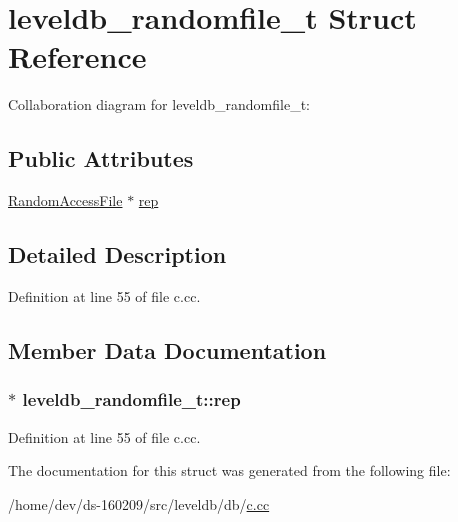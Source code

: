 \hypertarget{structleveldb__randomfile__t}{}\section{leveldb\+\_\+randomfile\+\_\+t Struct Reference}
\label{structleveldb__randomfile__t}


Collaboration diagram for leveldb\+\_\+randomfile\+\_\+t\+:
\subsection*{Public Attributes}
\begin{DoxyCompactItemize}
\item 
\hyperlink{classleveldb_1_1_random_access_file}{Random\+Access\+File} $\ast$ \hyperlink{structleveldb__randomfile__t_a66667ecc756a0ca312bbc94e2dfc27a5}{rep}
\end{DoxyCompactItemize}


\subsection{Detailed Description}


Definition at line 55 of file c.\+cc.



\subsection{Member Data Documentation}
\hypertarget{structleveldb__randomfile__t_a66667ecc756a0ca312bbc94e2dfc27a5}{}
\subsubsection[{rep}]{$\ast$ leveldb\+\_\+randomfile\+\_\+t\+::rep}\label{structleveldb__randomfile__t_a66667ecc756a0ca312bbc94e2dfc27a5}


Definition at line 55 of file c.\+cc.



The documentation for this struct was generated from the following file\+:\begin{DoxyCompactItemize}
\item 
/home/dev/ds-\/160209/src/leveldb/db/\hyperlink{c_8cc}{c.\+cc}\end{DoxyCompactItemize}
